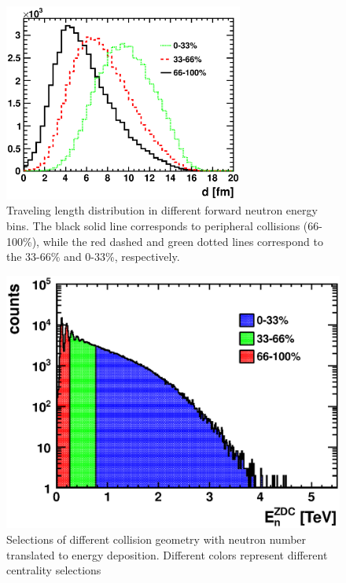 \begin{figure} 
\begin{center} 
\includegraphics[width=0.7\textwidth]{plots/chpt7/tau9_travel_dist_constrain.eps}
\caption[Geometric quantity constrained by forward neutron energy deposit binning method]
{Traveling length distribution in different forward neutron energy bins. The black solid line corresponds to peripheral collisions (66-100\%), while
the red dashed and green dotted lines correspond to the 33-66\% and 0-33\%, respectively.}
\label{fig:geoConstrain}
\end{center} 
\end{figure}


\begin{figure}
\begin{center}
\includegraphics[width=0.7\columnwidth,keepaspectratio]{plots/chpt7/tau9_neutron_bin_selection.eps}
\caption[Neutron binning method with the neutral energy deposition in ZDC]{Selections of different collision geometry with neutron number translated to energy deposition. Different colors represent different centrality selections}
\label{fig:neutronBin}
\end{center}
\end{figure}


